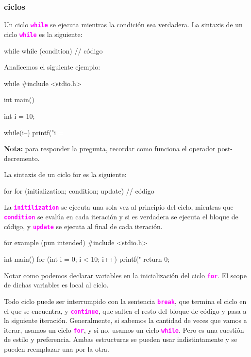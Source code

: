 \documentclass[]{scrartcl}
\newcommand{\hl}[1]{\textcolor{magenta}{\textbf{\texttt{#1}}}}
\begin{document}
\subsubsection*{ciclos}

Un ciclo \hl{while} se ejecuta mientras la condición sea verdadera. La sintaxis de un ciclo \hl{while} es la siguiente:

\begin{cbox}[]{while}
  while (condition) {
    // código
  }
\end{cbox}

Analicemos el siguiente ejemplo:

\begin{cbox}[]{while}
  #include <stdio.h>

  int main() {
    int i = 10;
  
    while(i--){
      printf("i = %
    }
  }

\end{cbox}

\begin{notebox}
  \textbf{Nota:} para responder la pregunta, recordar como funciona el operador post-decremento.
\end{notebox}

La sintaxis de un ciclo for es la siguiente:

\begin{cbox}[]{for}
  for (initialization; condition; update) {
    // código
  }
\end{cbox}

La \hl{initilization} se ejecuta una sola vez al principio del ciclo, mientras que \hl{condition} se evalúa en cada iteración y si es verdadera se ejecuta el bloque de código, y \hl{update} se ejecuta al final de cada iteración.

\begin{cbox}[]{for example (pun intended)}
  #include <stdio.h>
  
  int main() {
    for (int i = 0; i < 10; i++) {
      printf("%
    }
    return 0;
  }
\end{cbox}

Notar como podemos declarar variables en la inicialización del ciclo \hl{for}. El scope de dichas variables es local al ciclo.

Todo ciclo puede ser interrumpido con la sentencia \hl{break}, que termina el ciclo en el que se encuentra, y \hl{continue}, que saltea el resto del bloque de código y pasa a la siguiente iteración.
Generalmente, si sabemos la cantidad de veces que vamos a iterar, usamos un ciclo \hl{for}, y si no, usamos un ciclo \hl{while}. Pero es una cuestión de estilo y preferencia. Ambas estructuras se pueden usar indistintamente y se pueden reemplazar una por la otra.
\end{document}
